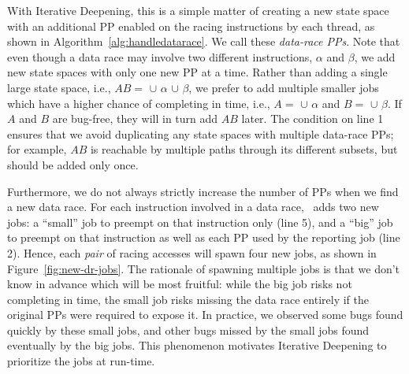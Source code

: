 With Iterative Deepening, this is a simple matter of creating a new state space with an additional PP enabled on the racing instructions by each thread, as shown in Algorithm~\ref{alg:handledatarace}.
We call these {\em data-race PPs}.
Note that even though a data race may involve two different instructions, $\alpha$ and $\beta$, we add new state spaces with only one new PP at a time.
Rather than adding a single large state space, %
i.e., $AB =$  $\cup$ $\alpha$ $\cup$ $\beta$,
we prefer to add multiple smaller jobs which have a higher chance of completing in time, i.e.,
$A =$  $\cup$ $\alpha$ and
$B =$  $\cup$ $\beta$.
If $A$ and $B$ are bug-free, they will in turn add $AB$ later.
The condition on line 1 ensures that we avoid duplicating any state spaces with multiple data-race PPs;
for example, $AB$ is reachable by multiple paths through its different subsets, but should be added only once.

Furthermore, we do not always strictly increase the number of PPs when we find a new data race.
For each instruction involved in a data race, \quicksand~adds two new jobs:
a ``small'' job to preempt on that instruction only (line 5),
and a ``big'' job to preempt on that instruction as well as each PP used by the reporting job (line 2).
%
Hence,
each {\em pair} of racing accesses will spawn four new jobs, as shown in Figure~\ref{fig:new-dr-jobs}.
%
The rationale of spawning multiple jobs is that we don't know in advance which will be most fruitful: %
while the big job risks not completing in time,
the small job risks missing the data race entirely if the original PPs were required to expose it.
In practice, we observed some bugs found quickly by these small jobs, and other bugs missed by the small jobs found eventually by the big jobs.
This phenomenon motivates Iterative Deepening to prioritize the jobs at run-time.

